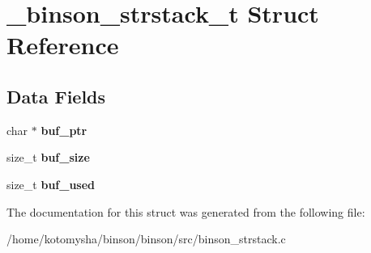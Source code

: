 \hypertarget{struct__binson__strstack__t}{\section{\-\_\-binson\-\_\-strstack\-\_\-t Struct Reference}
\label{struct__binson__strstack__t}
}
\subsection*{Data Fields}
\begin{DoxyCompactItemize}
\item 
\hypertarget{struct__binson__strstack__t_a753960e1acc54fb588209876a65bd04f}{char $\ast$ {\bfseries buf\-\_\-ptr}}\label{struct__binson__strstack__t_a753960e1acc54fb588209876a65bd04f}

\item 
\hypertarget{struct__binson__strstack__t_ae6563dde7454192031694b48405393d7}{size\-\_\-t {\bfseries buf\-\_\-size}}\label{struct__binson__strstack__t_ae6563dde7454192031694b48405393d7}

\item 
\hypertarget{struct__binson__strstack__t_a1bc03803cc43f4b073f266f15b23c3ac}{size\-\_\-t {\bfseries buf\-\_\-used}}\label{struct__binson__strstack__t_a1bc03803cc43f4b073f266f15b23c3ac}

\end{DoxyCompactItemize}


The documentation for this struct was generated from the following file\-:\begin{DoxyCompactItemize}
\item 
/home/kotomysha/binson/binson/src/binson\-\_\-strstack.\-c\end{DoxyCompactItemize}
